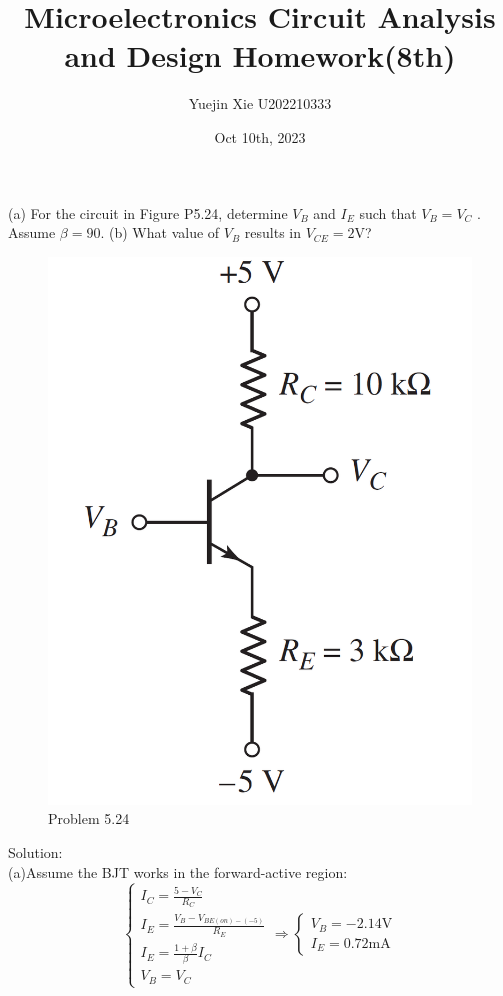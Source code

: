 \documentclass[a4paper,11pt,UTF8]{article}
\title{Microelectronics Circuit Analysis and Design Homework(8th)}
\author{Yuejin Xie \quad U202210333}
\date{Oct 10th, 2023}
\begin{document}
\maketitle
{} (a) For the circuit in Figure P5.24, determine $V_B$ and $I_E$ such that $V_B = V_C$ .
Assume $\beta = 90$. (b) What value of $V_B$ results in $V_{CE} = 2 $V?
\begin{figure}[H] 
	\centering 
	\includegraphics[scale=0.15]{MD5.24.png}
	\caption{Problem 5.24}
\end{figure}
\noindent Solution:\\
(a)Assume the BJT works in the forward-active region:\\
$$\begin{cases}
	\displaystyle I_C=\frac{5-V_C}{R_C}\\
	\displaystyle I_E=\frac{V_{B}-V_{BE(on)-(-5)}}{R_E}\\
	\displaystyle I_E=\frac{1+\beta}{\beta}I_C\\
	V_B=V_C
\end{cases}\Rightarrow
\begin{cases}
	V_B=-2.14\mathrm{V}\\
	I_E=0.72\mathrm{mA}
\end{cases} 
$$
\end{document}
